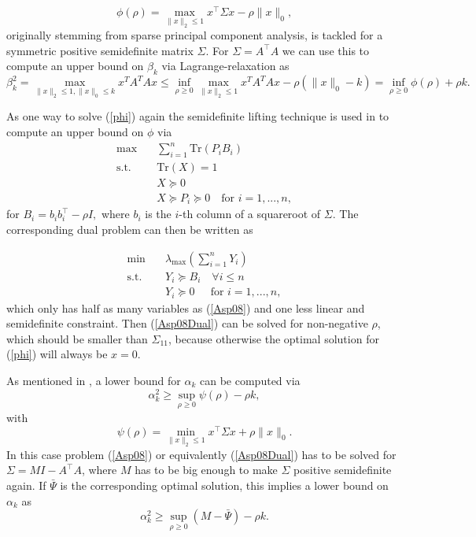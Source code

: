 \documentclass[journal]{IEEEtran}
\newcommand{\Norm}[2]{\lVert{#1}\rVert_{#2}}
\newcommand{\T}{^{\top}}
\newcommand{\Tr}{\text{Tr}}
\begin{document}
\begin{equation}\label{phi}
 \phi(\rho) = \max_{\Norm{x}{2} \leq 1} x\T \Sigma x - \rho \Norm{x}{0},
\end{equation}
originally stemming from sparse principal component analysis, is tackled for a symmetric positive semidefinite matrix $\Sigma$. For
$\Sigma = A\T A$ we can use this to compute an upper bound on $\beta_k$ via Lagrange-relaxation as
\begin{equation*}
\beta_k^2 = \max_{\|x\|_2 \leq 1, \|x\|_0 \leq k} x^TA^TAx \leq \inf_{\rho \geq 0} \max_{\|x\|_2\leq 1} x^TA^TAx - \rho (\|x\|_0-k) = \inf_{\rho \geq 0} \phi(\rho) + \rho k.
\end{equation*}

As one way to solve (\ref{phi}) again the semidefinite lifting technique is used in \cite{Asp08} to compute an upper bound on $\phi$ via
\begin{align}\label{Asp08}
 \max \quad & \sum_{i=1}^n\Tr(P_iB_i) \nonumber \\
 \text{s.t.} \quad & \Tr(X) = 1 \nonumber \\
 & X \succeq 0 \tag{A2-Primal} \\
 & X \succeq P_i \succeq 0 \quad \text{for } i = 1, ..., n, \nonumber
\end{align}
for $B_i = b_ib_i\T - \rho I,$ where $b_i$ is the $i$-th column of a squareroot of $\Sigma$. The corresponding dual problem can then be written as 

\begin{align}\label{Asp08Dual}
  \min \quad & \lambda_{\max}\left(\sum_{i=1}^n Y_i \right) \nonumber \\
  \text{s.t.} \quad & Y_i \succeq B_i \quad \forall i \leq n \tag{A2-Dual} \\
  & Y_i \succeq 0 \quad \ \ \text{for } i = 1, ..., n, \nonumber
\end{align}
which only has half as many variables as (\ref{Asp08}) and one less linear and semidefinite constraint. Then (\ref{Asp08Dual}) can be solved for non-negative $\rho$, which should be smaller than $\Sigma_{11}$, because otherwise the
optimal solution for (\ref{phi}) will always be $x=0$. 

As mentioned in \cite{Asp08}, a lower bound for $\alpha_k$ can be computed via
\begin{equation*}
 \alpha_k^2 \geq \sup_{\rho \geq 0} \psi(\rho) - \rho k,
\end{equation*}
with 
\begin{equation*}
 \psi(\rho) = \min_{\Norm{x}{2} \leq 1} x\T \Sigma x + \rho \Norm{x}{0}.
\end{equation*}
In this case problem (\ref{Asp08}) or equivalently (\ref{Asp08Dual}) has to be solved for $\Sigma = M I - A\T A$, where $M$ has to be big enough to make $\Sigma$ positive semidefinite again. If $\bar{\Psi}$ is the corresponding optimal solution, this implies
a lower bound on $\alpha_k$ as
\begin{equation*}
 \alpha_k^2 \geq \sup_{\rho \geq 0} (M - \bar{\Psi}) - \rho k.
\end{equation*}
\end{document}
